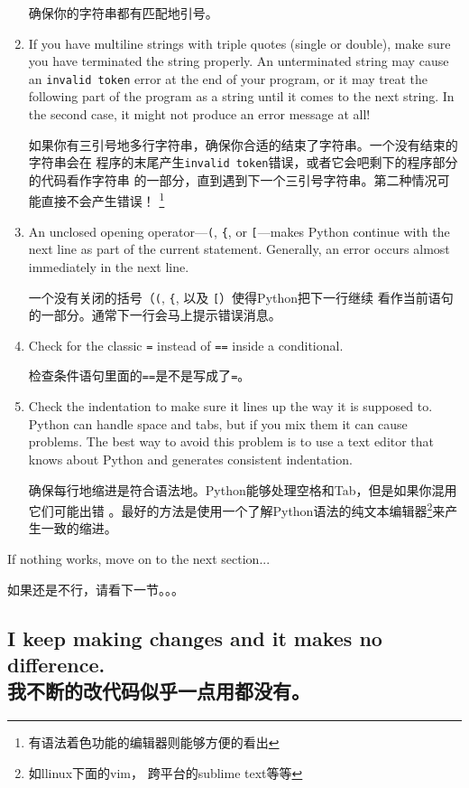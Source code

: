 \documentclass[10pt]{book}
\begin{document}
\begin{CJK}{UTF8}{gbsn}
\begin{enumerate}
确保你的字符串都有匹配地引号。

\item If you have multiline strings with triple quotes (single or double), make
sure you have terminated the string properly.  An unterminated string
may cause an {\tt invalid token} error at the end of your program,
or it may treat the following part of the program as a string until it
comes to the next string.  In the second case, it might not produce an error
message at all!

如果你有三引号地多行字符串，确保你合适的结束了字符串。一个没有结束的字符串会在
程序的末尾产生{\tt invalid token}错误，或者它会吧剩下的程序部分的代码看作字符串
的一部分，直到遇到下一个三引号字符串。第二种情况可能直接不会产生错误！
\footnote{有语法着色功能的编辑器则能够方便的看出}

\item An unclosed opening operator---\verb+(+, \verb+{+, or
  \verb+[+---makes Python continue with the next line as part of the
  current statement.  Generally, an error occurs almost immediately in
  the next line.

  一个没有关闭的括号（\verb+(+, \verb+{+, 以及 \verb+[+）使得Python把下一行继续
          看作当前语句的一部分。通常下一行会马上提示错误消息。

\item Check for the classic {\tt =} instead of {\tt ==} inside
a conditional.

检查条件语句里面的{\tt ==}是不是写成了{\tt =}。

\item Check the indentation to make sure it lines up the way it
is supposed to.  Python can handle space and tabs, but if you mix
them it can cause problems.  The best way to avoid this problem
is to use a text editor that knows about Python and generates
consistent indentation.

确保每行地缩进是符合语法地。Python能够处理空格和Tab，但是如果你混用它们可能出错
。最好的方法是使用一个了解Python语法的纯文本编辑器\footnote{如llinux下面的vim，
跨平台的sublime text等等}来产生一致的缩进。

\end{enumerate}

If nothing works, move on to the next section...

如果还是不行，请看下一节。。。


\subsection{I keep making changes and it makes no difference. \\ 我不断的改代码似乎一点用都没有。}


\end{CJK}
\end{document}
